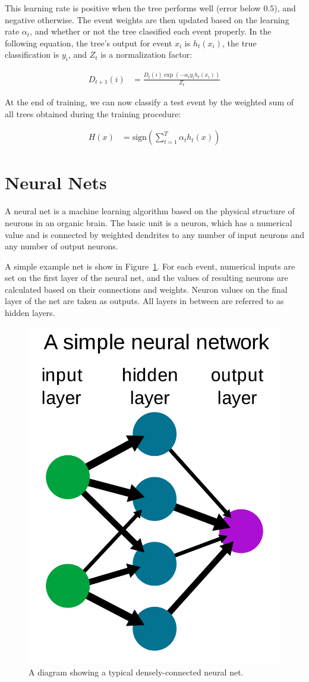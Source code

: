 This learning rate is positive when the tree performs well (error below $0.5$), and negative otherwise. The event weights are then updated based on the learning rate $\alpha_t$, and whether or not the tree classified each event properly. In the following equation, the tree's output for event $x_i$ is $h_t(x_i)$, the true classification is $y_i$, and $Z_t$ is a normalization factor:

\begin{align}
    D_{t+1}(i) &= \frac{D_t(i)\exp(-\alpha_t y_i h_t(x_i))}{Z_t}
\end{align}

At the end of training, we can now classify a test event by the weighted sum of all trees obtained during the training procedure:

\begin{align}
    H(x) &= \text{sign}(\sum_{t=1}^T \alpha_t h_t(x))
\end{align}

\section{Neural Nets}

A neural net is a machine learning algorithm based on the physical structure of neurons in an organic brain. The basic unit is a neuron, which has a numerical value and is connected by weighted dendrites to any number of input neurons and any number of output neurons.

A simple example net is show in Figure~\ref{fig:neural_net}. For each event, numerical inputs are set on the first layer of the neural net, and the values of resulting neurons are calculated based on their connections and weights. Neuron values on the final layer of the net are taken as outputs. All layers in between are referred to as hidden layers.

\begin{figure}[htbp]
    \centering
    \includegraphics[width=0.3\linewidth]{Images/ML/neural_net.png}
    \caption{A diagram showing a typical densely-connected neural net.}
    \label{fig:neural_net}
\end{figure}

